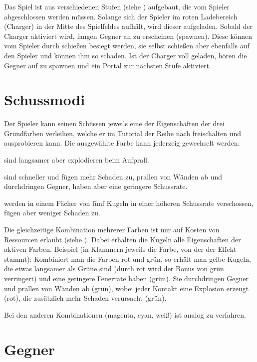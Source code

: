 \documentclass[a4paper,10pt,ngerman,fontsize=12pt]{scrreprt}
\begin{document}
Das Spiel ist aus verschiedenen Stufen (siehe ) aufgebaut, die vom Spieler abgeschlossen werden müssen.
Solange sich der Spieler im roten Ladebereich (Charger) in der Mitte des Spielfeldes aufhält, wird dieser aufgeladen.
Sobald der Charger aktiviert wird, fangen Gegner an zu erscheinen (spawnen). Diese können vom Spieler durch schie{\ss}en besiegt werden, sie selbst schie{\ss}en aber ebenfalls auf den Spieler und können ihm so schaden.
Ist der Charger voll geladen, hören die Gegner auf zu spawnen und ein Portal zur nächsten Stufe aktiviert.




\section{Schussmodi}

Der Spieler kann seinen Schüssen jeweils eine der Eigenschaften der drei Grundfarben verleihen, welche er im Tutorial der Reihe nach freischalten und ausprobieren kann. Die ausgewählte Farbe kann jederzeig gewechselt werden:

\renewcommand{\itmspace}{4.5em}
{sind langsamer aber explodieren beim Aufprall.}

{sind schneller und fügen mehr Schaden zu, prallen von Wänden ab und durchdringen Gegner, haben aber eine geringere Schussrate.}

{werden in einem Fächer von fünf Kugeln in einer höheren Schussrate verschossen, fügen aber weniger Schaden zu.}

Die gleichzeitige Kombination mehrerer Farben ist nur auf Kosten von Ressourcen erlaubt  (siehe ). Dabei erhalten die Kugeln alle Eigenschaften der aktiven Farben.
Beispiel (in Klammern jeweils die Farbe, von der der Effekt stammt): Kombiniert man die Farben rot und grün, so erhält man gelbe Kugeln, die etwas langsamer als Grüne sind (durch rot wird der Bonus von grün verringert) und eine geringere Feuerrate haben (grün). Sie durchdringen Gegner und prallen von Wänden ab (grün), wobei jeder Kontakt eine Explosion erzeugt (rot), die zusätzlich mehr Schaden verursacht (grün).

Bei den anderen Kombinationen (magenta, cyan, wei{\ss}) ist analog zu verfahren.


\section{Gegner}
\end{document}
